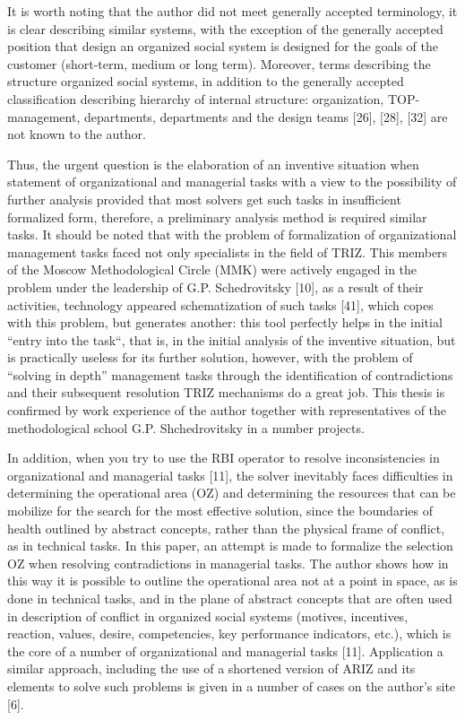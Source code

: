 \documentclass[11pt,a4paper]{book}
\begin{document}
It is worth noting that the author did not meet generally accepted
terminology, it is clear describing similar systems, with the exception of the
generally accepted position that design an organized social system is designed
for the goals of the customer (short-term, medium or long term). Moreover,
terms describing the structure organized social systems, in addition to the
generally accepted classification describing hierarchy of internal structure:
organization, TOP-management, departments, departments and the design teams
[26], [28], [32] are not known to the author.

Thus, the urgent question is the elaboration of an inventive situation when
statement of organizational and managerial tasks with a view to the
possibility of further analysis provided that most solvers get such tasks in
insufficient formalized form, therefore, a preliminary analysis method is
required similar tasks. It should be noted that with the problem of
formalization of organizational management tasks faced not only specialists in
the field of TRIZ. This members of the Moscow Methodological Circle (MMK) were
actively engaged in the problem under the leadership of G.P. Schedrovitsky
[10], as a result of their activities, technology appeared schematization of
such tasks [41], which copes with this problem, but generates another: this
tool perfectly helps in the initial “entry into the task“, that is, in the
initial analysis of the inventive situation, but is practically useless for
its further solution, however, with the problem of “solving in depth”
management tasks through the identification of contradictions and their
subsequent resolution TRIZ mechanisms do a great job. This thesis is confirmed
by work experience of the author together with representatives of the
methodological school G.P. Shchedrovitsky in a number projects.

In addition, when you try to use the RBI operator to resolve inconsistencies
in organizational and managerial tasks [11], the solver inevitably faces
difficulties in determining the operational area (OZ) and determining the
resources that can be mobilize for the search for the most effective solution,
since the boundaries of health outlined by abstract concepts, rather than the
physical frame of conflict, as in technical tasks. In this paper, an attempt
is made to formalize the selection OZ when resolving contradictions in
managerial tasks. The author shows how in this way it is possible to outline
the operational area not at a point in space, as is done in technical tasks,
and in the plane of abstract concepts that are often used in description of
conflict in organized social systems (motives, incentives, reaction, values,
desire, competencies, key performance indicators, etc.), which is the core of
a number of organizational and managerial tasks [11]. Application a similar
approach, including the use of a shortened version of ARIZ and its elements to
solve such problems is given in a number of cases on the author’s site [6].
\end{document}
